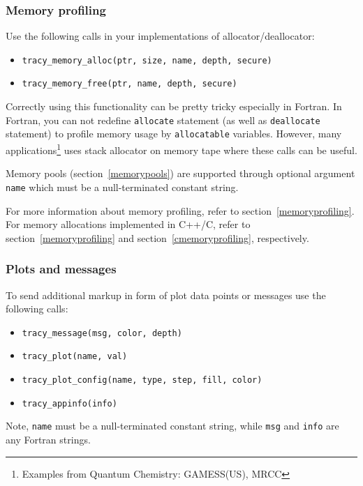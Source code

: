 \documentclass[hidelinks,titlepage,a4paper,twoside]{article}
\begin{document}
\subsubsection{Memory profiling}

Use the following calls in your implementations of allocator/deallocator:

\begin{itemize}
\item \texttt{tracy\_memory\_alloc(ptr, size, name, depth, secure)}
\item \texttt{tracy\_memory\_free(ptr, name, depth, secure)}
\end{itemize}

Correctly using this functionality can be pretty tricky especially in Fortran.
In Fortran, you can not redefine \texttt{allocate} statement (as well as \texttt{deallocate} statement) to profile memory usage by \texttt{allocatable} variables.
However, many applications\footnote{Examples from Quantum Chemistry: GAMESS(US), MRCC} uses stack allocator on memory tape where these calls can be useful.

Memory pools (section~\ref{memorypools}) are supported through optional argument \texttt{name} which must be a null-terminated constant string.

For more information about memory profiling, refer to section~\ref{memoryprofiling}.
For memory allocations implemented in C++/C,  refer to section~\ref{memoryprofiling} and section~\ref{cmemoryprofiling}, respectively.

\subsubsection{Plots and messages}

To send additional markup in form of plot data points or messages use the following calls:

\begin{itemize}
\item \texttt{tracy\_message(msg, color, depth)}
\item \texttt{tracy\_plot(name, val)}
\item \texttt{tracy\_plot\_config(name, type, step, fill, color)}
\item \texttt{tracy\_appinfo(info)}
\end{itemize}

Note, \texttt{name} must be a null-terminated constant string, while \texttt{msg} and \texttt{info} are any Fortran strings.
\end{document}

